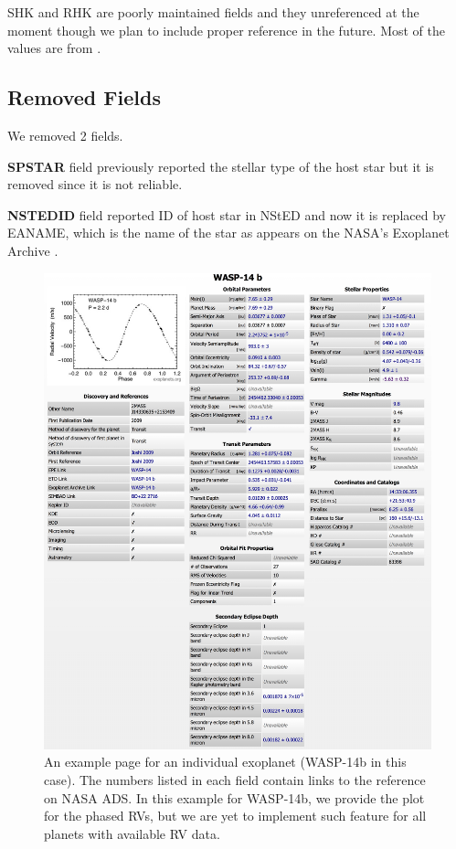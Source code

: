 \documentclass[11pt,preprint]{aastex}
\begin{document}
\begin{CJK*}{UTF8}{gbsn}
SHK and RHK are poorly maintained fields and they unreferenced at the
moment though we plan to include proper reference in the future. Most
of the values are from \cite{Butler2006}.

\subsection{Removed Fields}\label{sec:removed}

We removed 2 fields. 

{\bf SPSTAR} field previously reported the stellar type of the host
star but it is removed since it is not reliable. 

{\bf NSTEDID} field reported ID of host star in NStED and now it is
replaced by EANAME, which is the name of the star as appears on the
NASA's Exoplanet Archive \citep{Akeson2013}. 


\begin{figure}[!htb]
\centering
\includegraphics[width=\textwidth]{../fig/wasp-14b.eps}
\caption{An example page for an individual exoplanet (WASP-14b in this
  case). The numbers listed in each field contain links to the
  reference on NASA ADS. In this example for WASP-14b, we provide the plot
  for the phased RVs, but we are yet to implement such feature for all
  planets with available RV data.}
\label{fig:individual}
\end{figure}



\end{CJK*}
\end{document}

